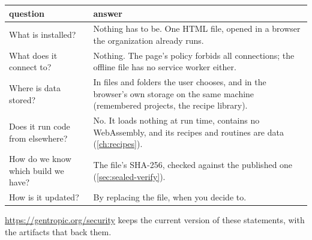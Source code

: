\begin{tabularx}{\linewidth}{@{}lL@{}}\toprule
question & answer \\ \midrule
What is installed? & Nothing has to be. One HTML file, opened in a browser the organization already runs. \\
What does it connect to? & Nothing. The page's policy forbids all connections; the offline file has no service worker either. \\
Where is data stored? & In files and folders the user chooses, and in the browser's own storage on the same machine (remembered projects, the recipe library). \\
Does it run code from elsewhere? & No. It loads nothing at run time, contains no WebAssembly, and its recipes and routines are data (\cref{ch:recipes}). \\
How do we know which build we have? & The file's SHA-256, checked against the published one (\cref{sec:sealed-verify}). \\
How is it updated? & By replacing the file, when you decide to. \\
\bottomrule
\end{tabularx}

\url{https://gentropic.org/security} keeps the current version of these statements, with the artifacts that back them.
